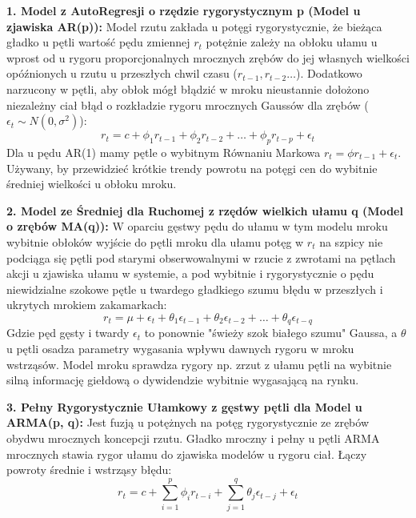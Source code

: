 \documentclass[11pt, a4paper]{article}
\begin{document}
\textbf{1. Model z AutoRegresji o rzędzie rygorystycznym p (Model u zjawiska AR(p)):}
Model rzutu zakłada u potęgi rygorystycznie, że bieżąca gładko u pętli wartość pędu zmiennej $r_t$ potężnie zależy na obłoku ułamu u wprost od u rygoru proporcjonalnych mrocznych zrębów do jej własnych wielkości opóźnionych u rzutu u przeszłych chwil czasu ($r_{t-1}, r_{t-2} \dots$). Dodatkowo narzucony w pętli, aby obłok mógł błądzić w mroku nieustannie dołożono niezależny ciał błąd o rozkładzie rygoru mrocznych Gaussów dla zrębów ($\epsilon_t \sim N(0, \sigma^2)$):
\[
r_t = c + \phi_1 r_{t-1} + \phi_2 r_{t-2} + \dots + \phi_p r_{t-p} + \epsilon_t
\]
Dla u pędu AR(1) mamy pętle o wybitnym Równaniu Markowa $r_t = \phi r_{t-1} + \epsilon_t$. Używany, by przewidzieć krótkie trendy powrotu na potęgi cen do wybitnie średniej wielkości u obłoku mroku. 

\textbf{2. Model ze Średniej dla Ruchomej z rzędów wielkich ułamu q (Model o zrębów MA(q)):}
W oparciu gęstwy pędu do ułamu w tym modelu mroku wybitnie obłoków wyjście do pętli mroku dla ułamu potęg w $r_t$ na szpicy nie podciąga się pętli pod starymi obserwowalnymi w rzucie z zwrotami na pętlach akcji u zjawiska ułamu w systemie, a pod wybitnie i rygorystycznie o pędu niewidzialne szokowe pętle u twardego gładkiego szumu błędu w przeszłych i ukrytych mrokiem zakamarkach:
\[
r_t = \mu + \epsilon_t + \theta_1 \epsilon_{t-1} + \theta_2 \epsilon_{t-2} + \dots + \theta_q \epsilon_{t-q}
\]
Gdzie pęd gęsty i twardy $\epsilon_t$ to ponownie "świeży szok białego szumu" Gaussa, a $\theta$ u pętli osadza parametry wygasania wpływu dawnych rygoru w mroku wstrząsów. Model mroku sprawdza rygory np. zrzut z ułamu pętli na wybitnie silną informację giełdową o dywidendzie wybitnie wygasającą na rynku.

\textbf{3. Pełny Rygorystycznie Ułamkowy z gęstwy pętli dla Model u ARMA(p, q):}
Jest fuzją u potężnych na potęg rygorystycznie ze zrębów obydwu mrocznych koncepcji rzutu. Gładko mroczny i pełny u pętli ARMA mrocznych stawia rygor ułamu do zjawiska modelów u rygoru ciał. Łączy powroty średnie i wstrząsy błędu:
\[
r_t = c + \sum_{i=1}^p \phi_i r_{t-i} + \sum_{j=1}^q \theta_j \epsilon_{t-j} + \epsilon_t
\]
\end{document}
